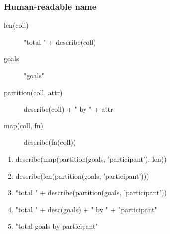 \documentclass{beamer}
\begin{document}
\begin{frame}
\frametitle{Human-readable name}
\begin{description}
\item[len(coll)] "total " + describe(coll)
\item[goals] "goals"
\item[partition(coll, attr)] describe(coll) + " by " + attr
\item[map(coll, fn)] describe(fn(coll))
\end{description}

\begin{example}
\begin{enumerate}
\item describe(map(partition(goals, 'participant'), len))
\item describe(len(partition(goals, 'participant')))
\item "total " + describe(partition(goals, 'participant'))
\item "total " + desc(goals) + " by " + "participant"
\item "total goals by participant"
\end{enumerate}
\end{example}
\end{frame}
\end{document}
